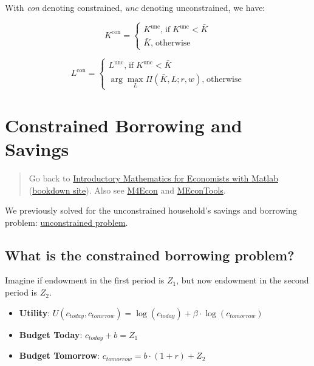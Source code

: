 \documentclass[
]{book}
\begin{document}
With \emph{con} denoting constrained, \emph{unc} denoting unconstrained, we have:

\[K^{\textrm{con}} =\left\lbrace \begin{array}{c}
K^{\textrm{unc}} \textrm{,}\;\textrm{if}\;K^{\textrm{unc}} <\bar{K} \\
\bar{K} \textrm{,}\;\textrm{otherwise}
\end{array}\right.\]

\[L^{\textrm{con}} =\left\lbrace \begin{array}{c}
L^{\textrm{unc}} \textrm{,}\;\textrm{if}\;K^{\textrm{unc}} <\bar{K} \\
\arg \max_L \Pi \left(\bar{K} ,L;r,w\right)\textrm{,}\;\textrm{otherwise}
\end{array}\right.\]

\hypertarget{constrained-borrowing-and-savings}{%
\section{Constrained Borrowing and Savings}\label{constrained-borrowing-and-savings}}

\begin{quote}
Go back to \href{https://math4econ.github.io/}{Introductory Mathematics for Economists with Matlab} (\href{https://math4econ.github.io/bookdown}{bookdown site}). Also see \href{http://fanwangecon.github.io/M4Econ}{M4Econ} and \href{https://fanwangecon.github.io/MEconTools/}{MEconTools}.
\end{quote}

We previously solved for the unconstrained household's savings and
borrowing problem: \href{https://math4econ.github.io/derivative_application/K_save_households.html}{unconstrained
problem}.

\hypertarget{what-is-the-constrained-borrowing-problem}{%
\subsection{What is the constrained borrowing problem?}\label{what-is-the-constrained-borrowing-problem}}

Imagine if endowment in the first period is \(Z_1\), but now endowment in
the second period is \(Z_2\).

\begin{itemize}
\item
  \textbf{Utility}:
  \(U(c_{today} ,c_{tomrrow} )=\log (c_{today} )+\beta \cdot \log (c_{tomorrow} )\)
\item
  \textbf{Budget Today}: \(c_{today} +b=Z_1\)
\item
  \textbf{Budget Tomorrow}: \(c_{tomorrow} =b\cdot (1+r)+Z_2\)
\end{itemize}
\end{document}
